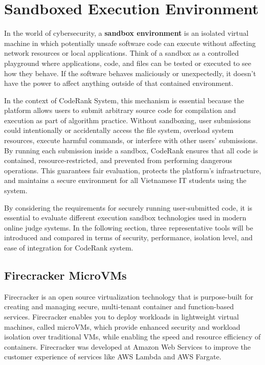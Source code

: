 \section{Sandboxed Execution Environment}
In the world of cybersecurity, a \textbf{sandbox environment} is an isolated virtual machine in which potentially unsafe software code can execute without affecting network resources or local applications. Think of a sandbox as a controlled playground where applications, code, and files can be tested or executed to see how they behave. If the software behaves maliciously or unexpectedly, it doesn’t have the power to affect anything outside of that contained environment. \cite{proofpoint_sandbox}

In the context of CodeRank System, this mechanism is essential because the platform allows users to submit arbitrary source code for compilation and execution as part of algorithm practice. Without sandboxing, user submissions could intentionally or accidentally access the file system, overload system resources, execute harmful commands, or interfere with other users’ submissions. By running each submission inside a sandbox, CodeRank ensures that all code is contained, resource-restricted, and prevented from performing dangerous operations. This guarantees fair evaluation, protects the platform’s infrastructure, and maintains a secure environment for all Vietnamese IT students using the system.

By considering the requirements for securely running user-submitted code, it is essential to evaluate different execution sandbox technologies used in modern online judge systems. In the following section, three representative tools will be introduced and compared in terms of security, performance, isolation level, and ease of integration for CodeRank system.

\subsection{Firecracker MicroVMs}
Firecracker is an open source virtualization technology that is purpose-built for creating and managing secure, multi-tenant container and function-based services. Firecracker enables you to deploy workloads in lightweight virtual machines, called microVMs, which provide enhanced security and workload isolation over traditional VMs, while enabling the speed and resource efficiency of containers. Firecracker was developed at Amazon Web Services to improve the customer experience of services like AWS Lambda and AWS Fargate. \cite{firecracker2025}

